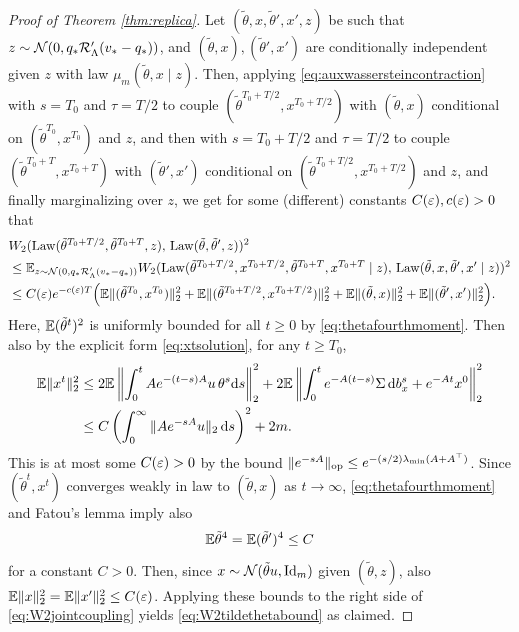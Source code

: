 \begin{proof}[Proof of Theorem \ref{thm:replica}]
Let $(\tilde\theta,x,\tilde\theta',x',z)$ be such that $z \sim
\mathcal{N}(0,q_*\mathcal{R}_\Lambda'(v_*-q_*))$, and $(\tilde\theta,x),(\tilde\theta',x')$
are conditionally independent given $z$ with law $\mu_m(\tilde\theta,x \mid z)$.
Then, applying \eqref{eq:auxwassersteincontraction} with $s=T_0$ and
$\tau=T/2$ to couple $(\tilde \theta^{T_0+T/2},x^{T_0+T/2})$ with
$(\tilde\theta,x)$ conditional on $(\tilde \theta^{T_0},x^{T_0})$ and $z$,
and then with $s=T_0+T/2$ and $\tau=T/2$ to couple
$(\tilde \theta^{T_0+T},x^{T_0+T})$ with $(\tilde\theta',x')$
conditional on $(\tilde \theta^{T_0+T/2},x^{T_0+T/2})$ and $z$,
and finally marginalizing over $z$, we get for some (different)
constants $C(\varepsilon),c(\varepsilon)>0$ that
\begin{align}
&W_2(\operatorname{Law}(\tilde \theta^{T_0+T/2},\tilde \theta^{T_0+T},z),
\,\operatorname{Law}(\tilde\theta,\tilde\theta',z))^2\notag\\
&\leq \mathbb{E}_{z \sim \mathcal{N}(0,q_*\mathcal{R}_\Lambda'(v_*-q_*))}
W_2(\operatorname{Law}(\tilde \theta^{T_0+T/2},x^{T_0+T/2},\tilde \theta^{T_0+T},
x^{T_0+T} \mid z),\,\operatorname{Law}(\tilde\theta,x,\tilde\theta',x' \mid z))^2\notag\\
& \leq C(\varepsilon)e^{-c(\varepsilon)T}\Big(\mathbb{E}\|(\tilde \theta^{T_0},x^{T_0})\|_2^2
+\mathbb{E}\|(\tilde \theta^{T_0+T/2},x^{T_0+T/2})\|_2^2
+\mathbb{E}\|(\tilde\theta,x)\|_2^2
+\mathbb{E}\|(\tilde\theta',x')\|_2^2\Big).\label{eq:W2jointcoupling}
\end{align}
Here, $\mathbb{E}(\tilde \theta^t)^2$ is uniformly bounded
for all $t \geq 0$ by \eqref{eq:thetafourthmoment}.
Then also by the explicit form \eqref{eq:xtsolution}, for any $t \geq T_0$,
\begin{align*}
\E\|x^t\|_2^2
&\leq 2\E\left\|\int_0^t Ae^{-(t-s)A}u\,\theta^s\d s\right\|_2^2
+2\E\left\|\int_0^t e^{-A(t-s)}\Sigma\,\d b_x^s + e^{-At} x^0\right\|_2^2\\
&\leq C\left(\int_0^\infty \|Ae^{-sA}u\|_2\,\d s\right)^2
+2m.%
\end{align*}
This is at most some $C(\varepsilon)>0$ by the bound $\|e^{-sA}\|_{\mathrm{op}} \leq
e^{-(s/2)\lambda_{\min}(A+A^\top)}$. Since $(\tilde \theta^t,x^t)$
converges weakly in law to $(\tilde \theta,x)$ as $t \to \infty$,
\eqref{eq:thetafourthmoment} and Fatou's lemma imply also
\begin{equation}\label{eq:staticfourthmoment}
\mathbb{E}\tilde\theta^4=\mathbb{E}(\tilde\theta')^4 \leq C
\end{equation} for a constant $C>0$. Then, since $x \sim \mathcal{N}(\tilde \theta
u,\mathrm{Id}_m)$ given $(\tilde \theta,z)$, also
$\mathbb{E}\|x\|_2^2=\mathbb{E}\|x'\|_2^2 \leq C(\varepsilon)$.
Applying these bounds to the right side of \eqref{eq:W2jointcoupling}
yields \eqref{eq:W2tildethetabound} as claimed.


\end{proof}
